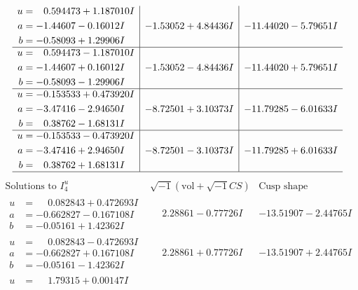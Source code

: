 \documentclass[1p]{elsarticle_modified}
\theoremstyle{definition}
\newcommand{\I}{\sqrt{-1}}
\begin{document}
$$\begin{array}{c|c|c}
\begin{aligned}
u &= \phantom{-}0.594473 + 1.187010 I \\
a &= -1.44607 - 0.16012 I \\
b &= -0.58093 + 1.29906 I\end{aligned}
 & -1.53052 + 4.84436 I & -11.44020 - 5.79651 I \\ \hline\begin{aligned}
u &= \phantom{-}0.594473 - 1.187010 I \\
a &= -1.44607 + 0.16012 I \\
b &= -0.58093 - 1.29906 I\end{aligned}
 & -1.53052 - 4.84436 I & -11.44020 + 5.79651 I \\ \hline\begin{aligned}
u &= -0.153533 + 0.473920 I \\
a &= -3.47416 - 2.94650 I \\
b &= \phantom{-}0.38762 - 1.68131 I\end{aligned}
 & -8.72501 + 3.10373 I & -11.79285 - 6.01633 I \\ \hline\begin{aligned}
u &= -0.153533 - 0.473920 I \\
a &= -3.47416 + 2.94650 I \\
b &= \phantom{-}0.38762 + 1.68131 I\end{aligned}
 & -8.72501 - 3.10373 I & -11.79285 + 6.01633 I\\
 \hline 
 \end{array}$$\newpage$$\begin{array}{c|c|c}  
\text{Solutions to }I^u_{4}& \I (\text{vol} + \sqrt{-1}CS) & \text{Cusp shape}\\
 \hline 
\begin{aligned}
u &= \phantom{-}0.082843 + 0.472693 I \\
a &= -0.662827 - 0.167108 I \\
b &= -0.05161 + 1.42362 I\end{aligned}
 & \phantom{-}2.28861 - 0.77726 I & -13.51907 - 2.44765 I \\ \hline\begin{aligned}
u &= \phantom{-}0.082843 - 0.472693 I \\
a &= -0.662827 + 0.167108 I \\
b &= -0.05161 - 1.42362 I\end{aligned}
 & \phantom{-}2.28861 + 0.77726 I & -13.51907 + 2.44765 I \\ \hline\begin{aligned}
u &= \phantom{-}1.79315 + 0.00147 I \\

\end{aligned}
\end{array}$$
\end{document}
